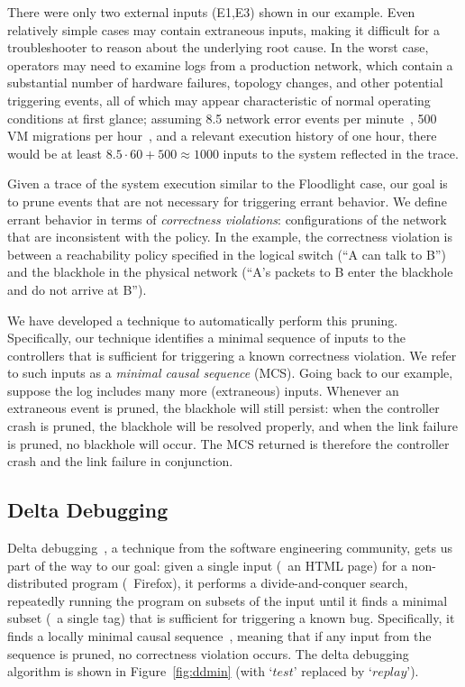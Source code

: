 There were only two external inputs (E1,E3) shown in our example.
Even relatively simple cases may contain extraneous inputs, making it difficult
for a troubleshooter to reason about the underlying root cause.
In the worst case, operators may need to examine logs from a production
network, which contain a substantial number of hardware failures, topology changes,
and other potential triggering events,
all of which may appear characteristic of normal operating
conditions at first glance; assuming 8.5 network error events per
minute~\cite{Greenberg:2009:VSF:1592568.1592576}, 500 VM migrations per
hour~\cite{Soundararajan:2010:CBS:1899928.1899941}, and a relevant execution
history of one hour, there would be at least $8.5 \cdot 60 + 500 \approx 1000$ inputs to the system
reflected in the trace.

Given a trace of the system execution similar to the Floodlight case,
our goal is to prune events that are not
necessary for triggering errant behavior. We define errant behavior in terms
of {\em correctness violations}:
configurations of the network that are inconsistent
with the policy. In the example, the correctness violation is between a
reachability policy specified in the logical switch (``A can talk to B'')
and the blackhole in the physical network (``A's packets to B enter the
blackhole and do not arrive at B'').

We have developed a technique to automatically perform this pruning.
Specifically, our technique identifies a minimal sequence of inputs
to the controllers that is sufficient for triggering a known correctness violation. We
refer to such inputs as a {\em minimal causal sequence} (MCS). Going back to our example,
suppose the log includes many more (extraneous) inputs. Whenever an
extraneous event is pruned, the blackhole will still persist: when
the controller crash is pruned, the blackhole will be resolved properly, and
when the link failure is pruned, no blackhole will occur. The MCS returned
is therefore the controller crash and the link failure in conjunction.

\subsection{Delta Debugging}
\label{subsec:algorithm}

Delta debugging~\cite{Zeller:1999:YMP:318773.318946}, a technique from the
software engineering community, gets us part of the way
to our goal: given a single input (\eg~an HTML page)
for a non-distributed program (\eg~Firefox), it performs a divide-and-conquer
search, repeatedly running the program on subsets of the input
until it finds a minimal subset (\eg~a single tag) that is sufficient
for triggering a known bug. Specifically, it finds a locally minimal
causal sequence~\cite{Zeller:1999:YMP:318773.318946},
meaning that if any input from the sequence is pruned, no correctness violation
occurs. The delta debugging algorithm is shown in
Figure~\ref{fig:ddmin} (with `$test$' replaced by `$replay$').

